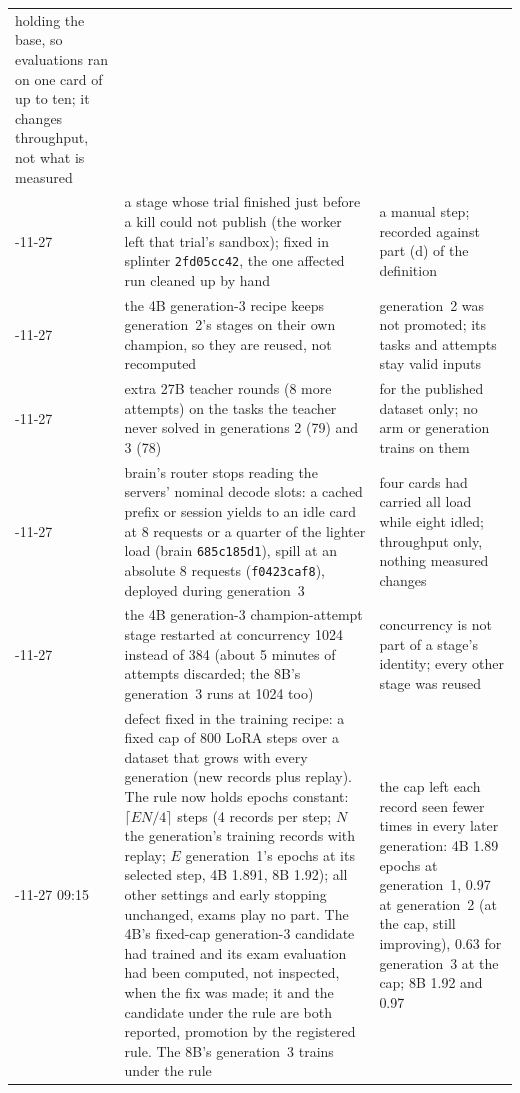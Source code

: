 {\begin{longtable}{>{\raggedright\arraybackslash}p{17mm}>{\raggedright\arraybackslash}p{64mm}>{\raggedright\arraybackslash}p{60mm}}
holding the base, so evaluations ran on one card of up to ten; it changes throughput, not what is measured \\
2026-11-27 & a stage whose trial finished just before a kill could not publish (the worker left that trial's sandbox); fixed
in splinter \texttt{2fd05cc42}, the one affected run cleaned up by hand & a manual step; recorded against part (d) of the
definition \\
2026-11-27 & the 4B generation-3 recipe keeps generation~2's stages on their own champion, so they are reused, not recomputed &
generation~2 was not promoted; its tasks and attempts stay valid inputs \\
2026-11-27 & extra 27B teacher rounds (8 more attempts) on the tasks the teacher never solved in generations 2 (79) and 3 (78) &
for the published dataset only; no arm or generation trains on them \\
2026-11-27 & brain's router stops reading the servers' nominal decode slots: a cached prefix or session yields to an idle card at
8 requests or a quarter of the lighter load (brain \texttt{685c185d1}), spill at an absolute 8 requests (\texttt{f0423caf8}),
deployed during generation~3 & four cards had carried all load while eight idled; throughput only, nothing measured changes \\
2026-11-27 & the 4B generation-3 champion-attempt stage restarted at concurrency 1024 instead of 384 (about 5 minutes of
attempts discarded; the 8B's generation~3 runs at 1024 too) & concurrency is not part of a stage's identity; every other stage
was reused \\
2026-11-27 09:15 & defect fixed in the training recipe: a fixed cap of 800 LoRA steps over a dataset that grows with every
generation (new records plus replay). The rule now holds epochs constant: $\lceil E N / 4\rceil$ steps (4 records per step;
$N$ the generation's training records with replay; $E$ generation~1's epochs at its selected step, 4B 1.891, 8B 1.92); all
other settings and early stopping unchanged, exams play no part. The 4B's fixed-cap generation-3 candidate had trained and its
exam evaluation had been computed, not inspected, when the fix was made; it and the candidate under the rule are both
reported, promotion by the registered rule. The 8B's generation~3 trains under the rule & the cap left each record seen fewer
times in every later generation: 4B 1.89 epochs at generation~1, 0.97 at generation~2 (at the cap, still improving), 0.63 for
generation~3 at the cap; 8B 1.92 and 0.97 \\
\bottomrule
\end{longtable}
}

